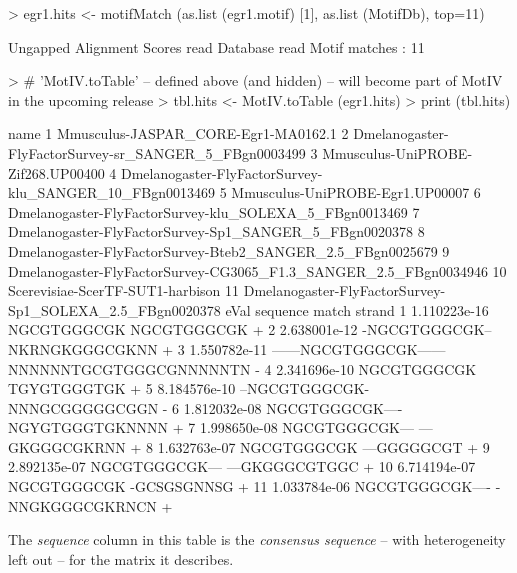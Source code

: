 \documentclass{article}
\renewenvironment{Schunk}{\vspace{\topsep}}{\vspace{\topsep}}
\begin{document}
\begin{Schunk}
\begin{Sinput}
> egr1.hits <- motifMatch (as.list (egr1.motif) [1], as.list (MotifDb), top=11)
\end{Sinput}
\begin{Soutput}
	Ungapped Alignment
	Scores read
	Database read
	Motif matches : 11
\end{Soutput}
\begin{Sinput}
> # 'MotIV.toTable' -- defined above (and hidden) -- will become part of MotIV in the upcoming release
> tbl.hits <- MotIV.toTable (egr1.hits)
> print (tbl.hits)
\end{Sinput}
\begin{Soutput}
                                                               name
1                               Mmusculus-JASPAR_CORE-Egr1-MA0162.1
2             Dmelanogaster-FlyFactorSurvey-sr_SANGER_5_FBgn0003499
3                                 Mmusculus-UniPROBE-Zif268.UP00400
4           Dmelanogaster-FlyFactorSurvey-klu_SANGER_10_FBgn0013469
5                                   Mmusculus-UniPROBE-Egr1.UP00007
6            Dmelanogaster-FlyFactorSurvey-klu_SOLEXA_5_FBgn0013469
7            Dmelanogaster-FlyFactorSurvey-Sp1_SANGER_5_FBgn0020378
8        Dmelanogaster-FlyFactorSurvey-Bteb2_SANGER_2.5_FBgn0025679
9  Dmelanogaster-FlyFactorSurvey-CG3065_F1.3_SANGER_2.5_FBgn0034946
10                                 Scerevisiae-ScerTF-SUT1-harbison
11         Dmelanogaster-FlyFactorSurvey-Sp1_SOLEXA_2.5_FBgn0020378
           eVal                sequence                   match strand
1  1.110223e-16             NGCGTGGGCGK             NGCGTGGGCGK      +
2  2.638001e-12          -NGCGTGGGCGK--          NKRNGKGGGCGKNN      +
3  1.550782e-11 ------NGCGTGGGCGK------ NNNNNNTGCGTGGGCGNNNNNTN      -
4  2.341696e-10             NGCGTGGGCGK             TGYGTGGGTGK      +
5  8.184576e-10          --NGCGTGGGCGK-          NNNGCGGGGGCGGN      -
6  1.812032e-08         NGCGTGGGCGK----         NGYGTGGGTGKNNNN      +
7  1.998650e-08          NGCGTGGGCGK---          ---GKGGGCGKRNN      +
8  1.632763e-07             NGCGTGGGCGK             ---GGGGGCGT      +
9  2.892135e-07          NGCGTGGGCGK---          ---GKGGGCGTGGC      +
10 6.714194e-07             NGCGTGGGCGK             -GCSGSGNNSG      +
11 1.033784e-06         NGCGTGGGCGK----         -NNGKGGGCGKRNCN      +
\end{Soutput}
\end{Schunk}

The \emph{sequence} column in this table is the \emph{consensus sequence} -- with heterogeneity left out -- for the 
matrix it describes.   
\end{document}
